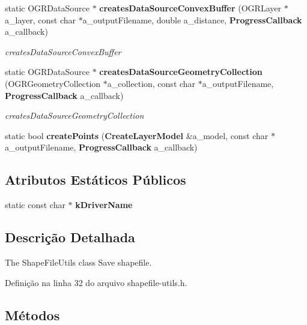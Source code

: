 \begin{DoxyCompactItemize}
static O\+G\+R\+Data\+Source $\ast$ {\bf creates\+Data\+Source\+Convex\+Buffer} (O\+G\+R\+Layer $\ast$a\+\_\+layer, const char $\ast$a\+\_\+output\+Filename, double a\+\_\+distance, {\bf Progress\+Callback} a\+\_\+callback)
\begin{DoxyCompactList}\small\item\em creates\+Data\+Source\+Convex\+Buffer \end{DoxyCompactList}\item 
static O\+G\+R\+Data\+Source $\ast$ {\bf creates\+Data\+Source\+Geometry\+Collection} (O\+G\+R\+Geometry\+Collection $\ast$a\+\_\+collection, const char $\ast$a\+\_\+output\+Filename, {\bf Progress\+Callback} a\+\_\+callback)
\begin{DoxyCompactList}\small\item\em creates\+Data\+Source\+Geometry\+Collection \end{DoxyCompactList}\item 
static bool {\bf create\+Points} ({\bf Create\+Layer\+Model} \&a\+\_\+model, const char $\ast$a\+\_\+output\+Filename, {\bf Progress\+Callback} a\+\_\+callback)
\end{DoxyCompactItemize}
\subsection*{Atributos Estáticos Públicos}
\begin{DoxyCompactItemize}
\item 
static const char $\ast$ {\bf k\+Driver\+Name}
\end{DoxyCompactItemize}


\subsection{Descrição Detalhada}
The Shape\+File\+Utils class  Save shapefile. 

Definição na linha 32 do arquivo shapefile-\/utils.\+h.



\subsection{Métodos}
